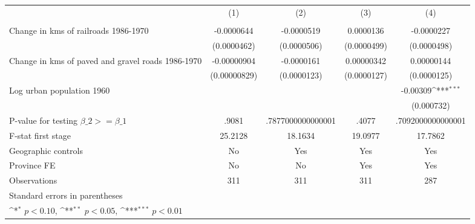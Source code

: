 {
\def\sym#1{\ifmmode^{#1}\else\(^{#1}\)\fi}
\begin{tabular}{l*{4}{c}}
\hline\hline
                &\multicolumn{1}{c}{(1)}&\multicolumn{1}{c}{(2)}&\multicolumn{1}{c}{(3)}&\multicolumn{1}{c}{(4)}\\
                &\multicolumn{1}{c}{}&\multicolumn{1}{c}{}&\multicolumn{1}{c}{}&\multicolumn{1}{c}{}\\
\hline
Change in kms of railroads 1986-1970&-0.0000644         &-0.0000519         &0.0000136         &-0.0000227         \\
                &(0.0000462)         &(0.0000506)         &(0.0000499)         &(0.0000498)         \\
[1em]
Change in kms of paved and gravel roads 1986-1970&-0.00000904         &-0.0000161         &0.00000342         &0.00000144         \\
                &(0.00000829)         &(0.0000123)         &(0.0000127)         &(0.0000125)         \\
[1em]
Log urban population 1960&                  &                  &                  & -0.00309\sym{***}\\
                &                  &                  &                  &(0.000732)         \\
\hline
P-value for testing $\beta\_{2} >= \beta\_{1}$&    .9081         &.7877000000000001         &    .4077         &.7092000000000001         \\
F-stat first stage&  25.2128         &  18.1634         &  19.0977         &  17.7862         \\
Geographic controls&       No         &      Yes         &      Yes         &      Yes         \\
Province FE     &       No         &       No         &      Yes         &      Yes         \\
Observations    &      311         &      311         &      311         &      287         \\
\hline\hline
\multicolumn{5}{l}{\footnotesize Standard errors in parentheses}\\
\multicolumn{5}{l}{\footnotesize \sym{*} \(p<0.10\), \sym{**} \(p<0.05\), \sym{***} \(p<0.01\)}\\
\end{tabular}
}
